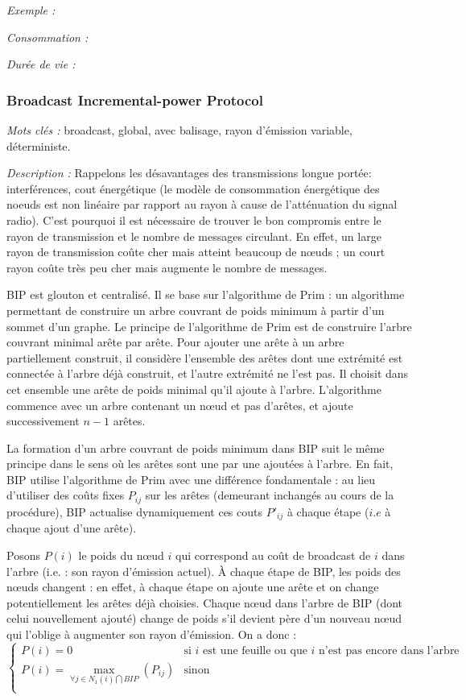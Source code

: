\emph{Exemple :} 

\emph{Consommation :} 

\emph{Durée de vie :} 



\subsubsection{Broadcast Incremental-power Protocol \cite{Wieselthier2000}}

\emph{Mots clés :} broadcast, global, avec balisage, rayon d'émission variable, déterministe.

\emph{Description :} Rappelons les désavantages des transmissions longue portée: interférences, cout énergétique (le modèle de consommation énergétique des noeuds est non linéaire par rapport au rayon à cause de l'atténuation du signal radio).
C'est pourquoi il est nécessaire de trouver le bon compromis entre le rayon de transmission et le nombre de messages circulant. En effet, un large rayon de transmission coûte cher mais atteint beaucoup de nœuds ; un court rayon coûte très peu cher mais augmente le nombre de messages. 

BIP est glouton et centralisé. Il se base sur l'algorithme de Prim \cite{Prim1957} : un algorithme permettant de construire un arbre couvrant de poids minimum à partir d'un sommet d'un graphe. Le principe de l'algorithme de Prim est de construire l'arbre couvrant minimal arête par arête. Pour ajouter une arête à un arbre partiellement construit, il considère l'ensemble des arêtes dont une extrémité est connectée à l'arbre déjà construit, et l'autre extrémité ne l'est pas. Il choisit dans cet ensemble une arête de poids minimal qu'il ajoute à l'arbre. L'algorithme commence avec un arbre contenant un nœud et pas d'arêtes, et ajoute successivement $n-1$ arêtes.

La formation d'un arbre couvrant de poids minimum dans BIP suit le même principe dans le sens où les arêtes sont une par une ajoutées à l'arbre. En fait, BIP utilise l'algorithme de Prim avec une différence fondamentale : au lieu d'utiliser des coûts fixes $P_{ij}$ sur les arêtes (demeurant inchangés au cours de la procédure), BIP actualise dynamiquement ces couts $P'_{ij}$ à chaque étape ($i.e$ à chaque ajout d'une arête).

Posons $P(i)$ le poids du nœud $i$ qui correspond au coût de broadcast de $i$ dans l'arbre (i.e. : son rayon d'émission actuel). À chaque étape de BIP, les poids des nœuds changent : en effet, à chaque étape on ajoute une arête et on change potentiellement les arêtes déjà choisies. Chaque nœud dans l'arbre de BIP (dont celui nouvellement ajouté) change de poids s'il devient père d'un nouveau nœud qui l'oblige à augmenter son rayon d'émission. On a donc :
$$\begin{cases}
	P(i)=0  & \text{si $i$ est une feuille ou que $i$ n'est pas encore dans l'arbre}\\
	P(i)=\max\limits_{\forall j\in N_1(i)\bigcap BIP}(P_{ij}) & \text{sinon}\\
\end{cases}$$


